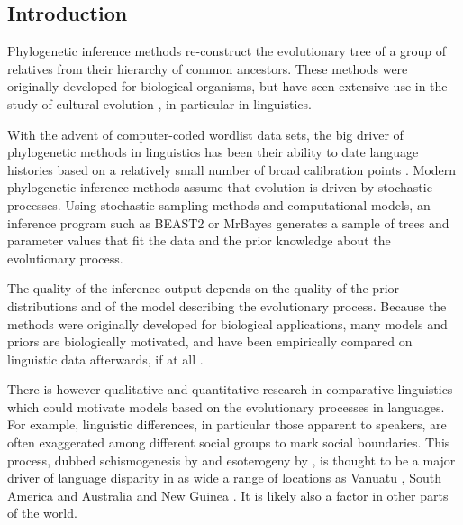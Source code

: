 \documentclass[]{rsos}%
\begin{document}
\begin{fmtext}
\section{Introduction}
Phylogenetic inference methods re-construct the evolutionary tree of a group of
relatives from their hierarchy of common ancestors.
These methods were originally developed for biological organisms, but have seen extensive
use in the study of cultural evolution \parencite{evans2021uses}, in particular in
linguistics.
\end{fmtext}
\maketitle
With the advent of computer-coded wordlist data sets, the big driver of
phylogenetic methods in linguistics has been their ability to date language
histories based on a relatively small number of broad calibration points
\parencite{borchsenius2017phylogenetics}.
Modern phylogenetic inference methods assume that evolution is driven by
stochastic processes. Using stochastic sampling methods and computational models,
an inference program such as BEAST2 \parencite{beast2} or MrBayes \parencite{mrbayes}
generates a sample of trees and parameter values that fit the data and the prior knowledge
about the evolutionary process.


The quality of the inference output depends on the quality of the prior distributions
and of the model describing the evolutionary process. Because the methods were originally
developed for biological applications, many models and priors are biologically motivated,
and have been empirically compared on linguistic data afterwards, if at all \parencite{kaiping2021systematic,rama2018three}.

There is however qualitative and quantitative research in comparative linguistics
which could motivate models based on the evolutionary processes in languages.
For example, linguistic differences, in particular those apparent to speakers, are often
exaggerated among different social groups to mark social boundaries. This
process, dubbed schismogenesis by \textcite{bateson1935culture} and esoterogeny
by \textcite{thurston1987processes}, is thought to be a major driver of language disparity in
as wide a range of locations as Vanuatu \parencite{francois2011social}, South America \parencite{epps2020amazonian}
and Australia and New Guinea \parencite{evans2019linguistic}. It is likely also a factor in other parts of the world.
\end{document}

